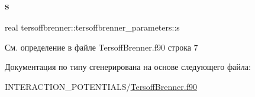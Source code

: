 \subsubsection{\texorpdfstring{s}{s}}
{\footnotesize\ttfamily real tersoffbrenner\+::tersoffbrenner\+\_\+parameters\+::s}



См. определение в файле Tersoff\+Brenner.\+f90 строка 7



Документация по типу сгенерирована на основе следующего файла\+:\begin{DoxyCompactItemize}
\item 
I\+N\+T\+E\+R\+A\+C\+T\+I\+O\+N\+\_\+\+P\+O\+T\+E\+N\+T\+I\+A\+L\+S/\mbox{\hyperlink{_tersoff_brenner_8f90}{Tersoff\+Brenner.\+f90}}\end{DoxyCompactItemize}

